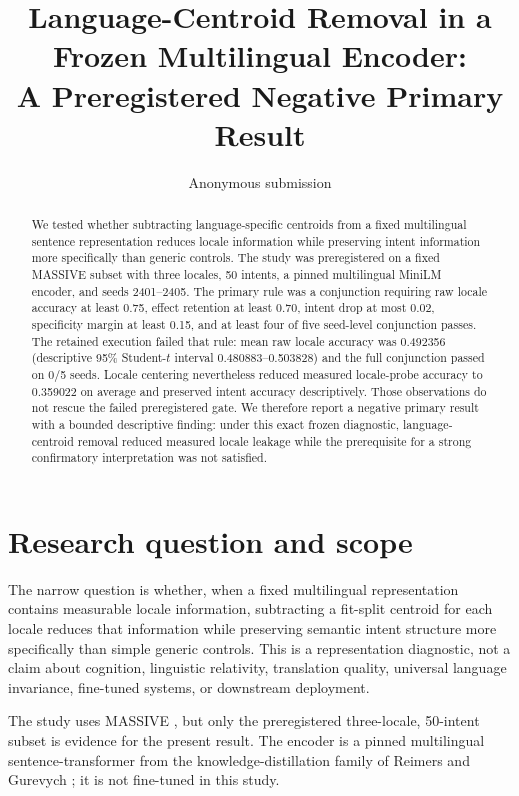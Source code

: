 \documentclass[10pt,twocolumn]{article}
\title{Language-Centroid Removal in a Frozen Multilingual Encoder:\\A Preregistered Negative Primary Result}
\author{Anonymous submission}
\date{}
\begin{document}
\maketitle

\begin{abstract}
We tested whether subtracting language-specific centroids from a fixed multilingual sentence representation reduces locale information while preserving intent information more specifically than generic controls. The study was preregistered on a fixed MASSIVE subset with three locales, 50 intents, a pinned multilingual MiniLM encoder, and seeds 2401--2405. The primary rule was a conjunction requiring raw locale accuracy at least 0.75, effect retention at least 0.70, intent drop at most 0.02, specificity margin at least 0.15, and at least four of five seed-level conjunction passes. The retained execution failed that rule: mean raw locale accuracy was 0.492356 (descriptive 95\% Student-$t$ interval 0.480883--0.503828) and the full conjunction passed on 0/5 seeds. Locale centering nevertheless reduced measured locale-probe accuracy to 0.359022 on average and preserved intent accuracy descriptively. Those observations do not rescue the failed preregistered gate. We therefore report a negative primary result with a bounded descriptive finding: under this exact frozen diagnostic, language-centroid removal reduced measured locale leakage while the prerequisite for a strong confirmatory interpretation was not satisfied.
\end{abstract}

\section{Research question and scope}
The narrow question is whether, when a fixed multilingual representation contains measurable locale information, subtracting a fit-split centroid for each locale reduces that information while preserving semantic intent structure more specifically than simple generic controls. This is a representation diagnostic, not a claim about cognition, linguistic relativity, translation quality, universal language invariance, fine-tuned systems, or downstream deployment.

The study uses MASSIVE \cite{fitzgerald2023massive}, but only the preregistered three-locale, 50-intent subset is evidence for the present result. The encoder is a pinned multilingual sentence-transformer from the knowledge-distillation family of Reimers and Gurevych \cite{reimers2020multilingual}; it is not fine-tuned in this study.
\end{document}
